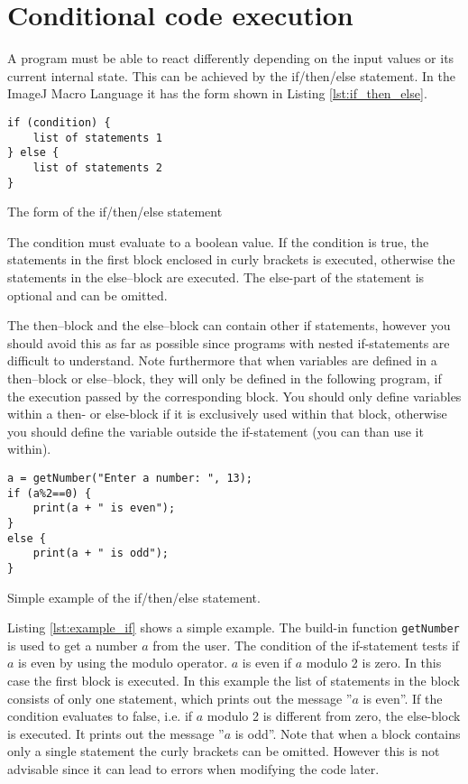 \section{Conditional code execution}

A program must be able to react differently depending on the input values or its current internal state. This can be achieved by the if/then/else statement. In the ImageJ Macro Language it has the form shown in Listing \ref{lst:if_then_else}.

\begin{listing}[H]
\begin{verbatim}
if (condition) {
	list of statements 1
} else {
	list of statements 2
}
\end{verbatim}
\caption{The form of the if/then/else statement}
\label{lst:if_then_else}
\end{listing}

The condition must evaluate to a boolean value. If the condition is true, the statements in the first block enclosed in curly brackets is executed, otherwise the statements in the else--block are executed. The else-part of the statement is optional and can be omitted. 

The then--block and the else--block can contain other if statements, however you should avoid this as far as possible since programs with nested if-statements are difficult to understand. Note furthermore that when variables are defined in a then--block or else--block, they will only be defined in the following program, if the execution passed by the corresponding block. You should only define variables within a then- or else-block if it is exclusively used within that block, otherwise you should define the variable outside the if-statement (you can than use it within).

\begin{listing}[H]
\begin{verbatim}
a = getNumber("Enter a number: ", 13);
if (a%2==0) {
	print(a + " is even");
}
else { 
	print(a + " is odd");
}
\end{verbatim}
\caption{Simple example of the if/then/else statement.}
\label{lst:example_if}
\end{listing}

Listing \ref{lst:example_if} shows a simple example. The build-in function {\tt getNumber} is used to get a number $a$ from the user. The condition of the if-statement tests if $a$ is even by using the modulo operator. $a$ is even if $a$ modulo 2 is zero. In this case the first block is executed. In this example the list of statements in the block consists of only one statement, which prints out the message ''$a$ is even''. If the condition evaluates to false, i.e. if $a$ modulo 2 is different from zero, the else-block is executed. It prints out the message ''$a$ is odd''. Note that when a block contains only a single statement the curly brackets can be omitted. However this is not advisable since it can lead to errors when modifying the code later.

